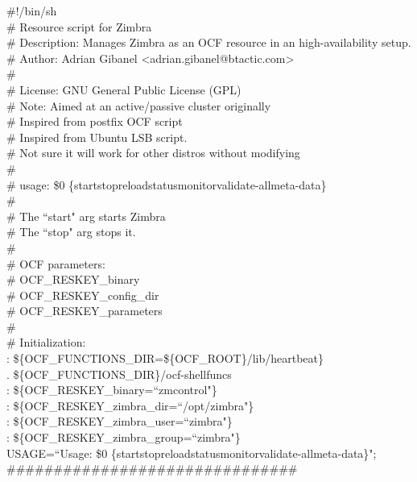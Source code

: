 \documentclass[a4paper, 12pt]{book}
\begin{document}
\#!/bin/sh\\
\# Resource script for Zimbra\\
\# Description:  Manages Zimbra as an OCF resource in an high-availability setup.\\
\# Author: Adrian Gibanel \textless adrian.gibanel@btactic.com\textgreater \\
\#\\
\# License: GNU General Public License (GPL)\\
\# Note:  Aimed at an active/passive cluster originally\\
\#        Inspired from postfix OCF script\\
\#        Inspired from Ubuntu LSB script.\\
\#        Not sure it will work for other distros without modifying\\
\#\\
\#   usage: \$0 \{start\textbar stop\textbar reload\textbar status\textbar monitor\textbar validate-all\textbar meta-data\}\\
\#\\
\#       The ``start" arg starts Zimbra\\
\#       The ``stop" arg stops it.\\
\#\\
\# OCF parameters:\\
\#  OCF\_RESKEY\_binary\\
\#  OCF\_RESKEY\_config\_dir\\
\#  OCF\_RESKEY\_parameters\\
\#\\

\noindent \# Initialization:\\
\noindent : \$\{OCF\_FUNCTIONS\_DIR=\$\{OCF\_ROOT\}/lib/heartbeat\}\\
. \$\{OCF\_FUNCTIONS\_DIR\}/ocf-shellfuncs\\
: \$\{OCF\_RESKEY\_binary=``zmcontrol"\}\\
: \$\{OCF\_RESKEY\_zimbra\_dir=``/opt/zimbra"\}\\
: \$\{OCF\_RESKEY\_zimbra\_user=``zimbra"\}\\
: \$\{OCF\_RESKEY\_zimbra\_group=``zimbra"\}\\
USAGE=``Usage: \$0 \{start\textbar stop\textbar reload\textbar status\textbar monitor\textbar validate-all\textbar meta-data\}";\\

\noindent \#\#\#\#\#\#\#\#\#\#\#\#\#\#\#\#\#\#\#\#\#\#\#\#\#\#\#\#\#\#\#\\
\end{document}
